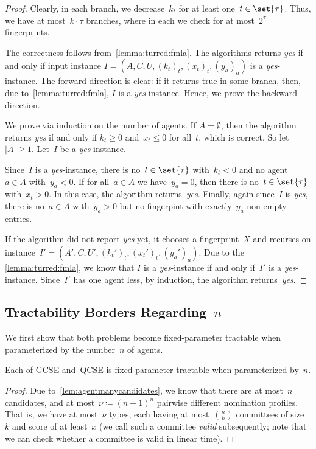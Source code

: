 \documentclass[10pt,a4paper,twocolumn]{article}
\theoremstyle{plain}
\theoremstyle{definition}
\theoremstyle{remark}
\newcommand{\prob}[1]{\textnormal{\textsc{#1}}}
\newcommand{\wpb}{when parameterized by}
\newcommand{\fpt}{fixed-parameter tractable}
\newcommand{\yes}{\emph{yes}}
\newcommand{\ceq}{\coloneqq}
\newcommand{\smlaAcr}{\prob{GCSE}}
\newcommand{\fmlaAcr}{\prob{QCSE}}
\begin{document}
{{  \begin{proof}
  Clearly,
  in each branch,
  we decrease~$k_t$ for at least one~$t\in\set{\tau}$.
  Thus,
  we have at most~$k\cdot\tau$ branches,
  where in each we check for at most~$2^\tau$ fingerprints.
  
  The correctness follows from~\cref{lemma:turred:fmla}.
  The algorithms returns \yes{}
  if and only if 
  input instance
  $I=(A,C,U,(k_t)_t,(x_t)_t,(y_a)_a)$ is a \yes-instance.
  The forward direction is clear:
  if it returns true in some branch,
  then,
  due to~\cref{lemma:turred:fmla},
  $I$ is a \yes-instance.
  Hence, 
  we prove the backward direction.
  
  We prove via induction on the number of agents.
  If $A=\emptyset$,
  then the algorithm returns \yes{}
  if and only if 
  $k_t\geq0$ and~$x_t\leq 0$ for all~$t$,
  which is correct.
  So let~$|A|\geq 1$.
  Let~$I$ be a \yes-instance.
  
  Since~$I$ is a \yes-instance,
  there is no~$t\in\set{\tau}$ with~$k_t<0$
  and no agent~$a\in A$ with~$y_a<0$.
  If for all~$a\in A$ we have~$y_a= 0$,
  then there is no~$t\in\set{\tau}$ with~$x_t>0$.
  In this case,
  the algorithm returns~\yes{}.
  Finally,
  again since~$I$ is \yes{},
  there is no~$a\in A$ with~$y_a>0$ 
  but no fingerpint with exactly~$y_a$ non-empty entries.

  If the algorithm did not report \yes{} yet,
  it chooses a fingerprint~$X$ and recurses on instance~$I'=(A',C,U',(k_t')_t,(x_t')_t,(y_a')_a)$.
  Due to the \cref{lemma:turred:fmla},
  we know that
  $I$ is a \yes-instance if and only if~$I'$ is a \yes-instance.
  Since~$I'$ has one agent less,
  by induction,
  the algorithm returns~\yes{}.
  \end{proof}
}


%
%
%
\subsection{Tractability Borders Regarding~\texorpdfstring{$n$}{n}}
%

We first show that both problems become fixed-parameter tractable when
parameterized by the number~$n$ of agents.

\begin{theorem}
  \label{thm:n}
 Each of \smlaAcr{} and~\fmlaAcr{} is \fpt{} \wpb{}~$n$.
\end{theorem}

\begin{proof}
 Due to~\cref{lem:agentmanycandidates},
 we know that there are at most~$n$ candidates,
 and 
 at most~$\nu\ceq (n+1)^n$ pairwise different nomination profiles.
 That is,
 we have at most~$\nu$ types,
 each having at most~$\binom{n}{k}$ committees of size~$k$ and score of at least~$x$
 (we call such a committee \emph{valid} subsequently; 
 note that we can check whether a committee is valid in linear time).
 

\end{proof}}
\end{document}

